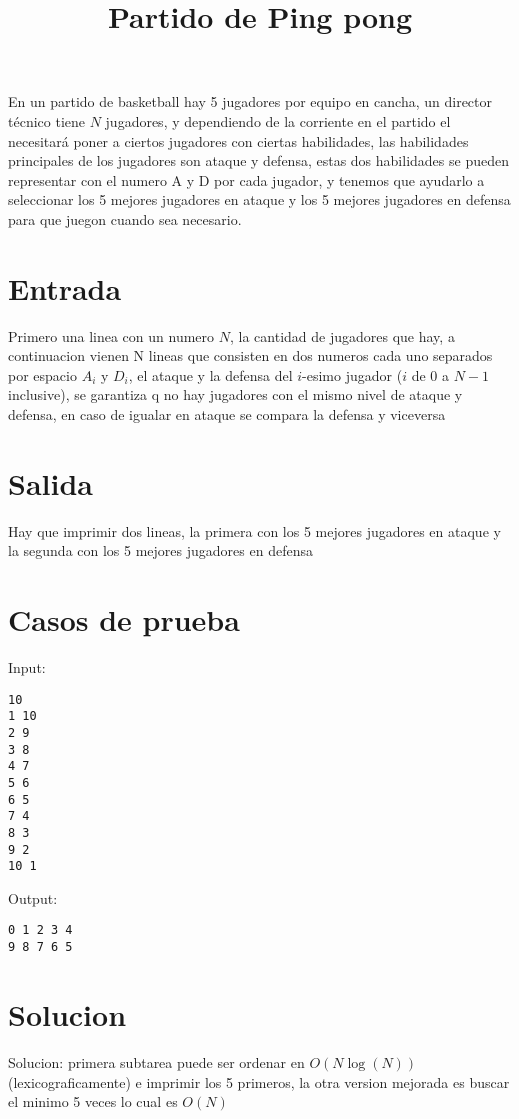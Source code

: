 \documentclass{article}
\title{Partido de Ping pong}
\begin{document}
\maketitle

En un partido de basketball hay 5 jugadores por equipo en cancha, un director técnico tiene $N$ jugadores, y dependiendo de la corriente en el partido
el necesitará poner a ciertos jugadores con ciertas habilidades, las habilidades principales de los jugadores son ataque y defensa, estas dos habilidades
se pueden representar con el numero A y D por cada jugador, y tenemos que ayudarlo a seleccionar los 5 mejores jugadores en ataque y los 5 mejores jugadores
en defensa para que juegon cuando sea necesario.

\section*{Entrada}

Primero una linea con un numero $N$, la cantidad de jugadores que hay, a continuacion vienen N lineas que consisten en dos numeros cada uno separados por espacio
$A_i$ y $D_i$, el ataque y la defensa del $i$-esimo jugador ($i$ de 0 a $N-1$ inclusive), se garantiza q no hay jugadores con el mismo nivel de ataque y defensa, en caso de
igualar en ataque se compara la defensa y viceversa

\section*{Salida}

Hay que imprimir dos lineas, la primera con los 5 mejores jugadores en ataque y la segunda con los 5 mejores jugadores en defensa

\section*{Casos de prueba}

Input:

\begin{verbatim}
10
1 10
2 9
3 8
4 7
5 6
6 5
7 4
8 3
9 2
10 1
\end{verbatim}

Output:

\begin{verbatim}
0 1 2 3 4
9 8 7 6 5
\end{verbatim}

\section*{Solucion}
Solucion: primera subtarea puede ser ordenar en $O(N\log(N))$ (lexicograficamente) e imprimir los 5 primeros, la otra version mejorada es buscar el minimo 5 veces lo cual es $O(N)$
\end{document}
